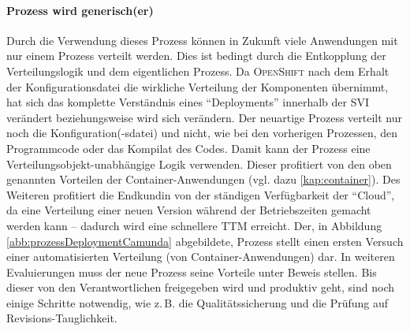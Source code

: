 \paragraph{Prozess wird generisch(er)} Durch die Verwendung dieses Prozess können in Zukunft viele Anwendungen mit nur einem Prozess verteilt werden. Dies ist bedingt durch die Entkopplung der Verteilungslogik und dem eigentlichen Prozess. Da \textsc{OpenShift} nach dem Erhalt der Konfigurationsdatei die wirkliche Verteilung der Komponenten übernimmt, hat sich das komplette Verständnis eines \enquote{Deployments} innerhalb der \ac{SVI} verändert beziehungsweise wird sich verändern. Der neuartige Prozess verteilt nur noch die Konfiguration(-sdatei) und nicht, wie bei den vorherigen Prozessen, den Programmcode oder das Kompilat des Codes. Damit kann der Prozess eine Verteilungsobjekt-unabhängige Logik verwenden. Dieser profitiert von den oben genannten Vorteilen der Container-Anwendungen (vgl. dazu \vref{kap:container}). Des Weiteren profitiert die Endkundin von der ständigen Verfügbarkeit der \enquote{Cloud}, da eine Verteilung einer neuen Version während der Betriebszeiten gemacht werden kann -- dadurch wird eine schnellere \ac{TTM} erreicht. Der, in Abbildung \vref{abb:prozessDeploymentCamunda} abgebildete, Prozess stellt einen ersten Versuch einer automatisierten Verteilung (von Container-Anwendungen) dar. In weiteren Evaluierungen muss der neue Prozess seine Vorteile unter Beweis stellen. Bis dieser von den Verantwortlichen freigegeben wird und produktiv geht, sind noch einige Schritte notwendig, wie z.\,B. die Qualitätssicherung und die Prüfung auf Revisions-Tauglichkeit.

